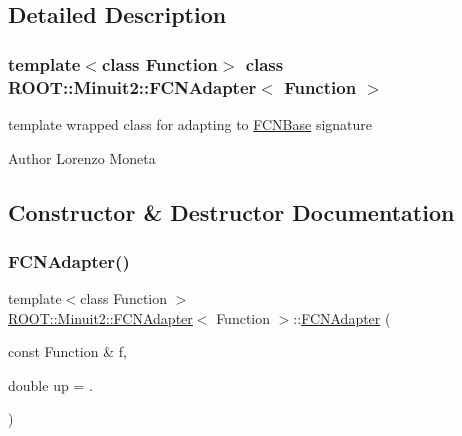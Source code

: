\subsection{Detailed Description}
\subsubsection*{template$<$class Function$>$\newline
class R\+O\+O\+T\+::\+Minuit2\+::\+F\+C\+N\+Adapter$<$ Function $>$}

template wrapped class for adapting to \mbox{\hyperlink{classROOT_1_1Minuit2_1_1FCNBase}{F\+C\+N\+Base}} signature

\begin{DoxyAuthor}{Author}
Lorenzo Moneta 
\end{DoxyAuthor}


\subsection{Constructor \& Destructor Documentation}
\mbox{\label{classROOT_1_1Minuit2_1_1FCNAdapter_a0cd70aee01a37c53792062b4118588dc}} 
\subsubsection{\texorpdfstring{FCNAdapter()}{FCNAdapter()}\hspace{0.1cm}{\footnotesize\ttfamily [1/2]}}
{\footnotesize\ttfamily template$<$class Function $>$ \\
\mbox{\hyperlink{classROOT_1_1Minuit2_1_1FCNAdapter}{R\+O\+O\+T\+::\+Minuit2\+::\+F\+C\+N\+Adapter}}$<$ Function $>$\+::\mbox{\hyperlink{classROOT_1_1Minuit2_1_1FCNAdapter}{F\+C\+N\+Adapter}} (\begin{DoxyParamCaption}\item[{const Function \&}]{f,  }\item[{double}]{up = {.} }\end{DoxyParamCaption})\hspace{0.3cm}{\ttfamily [inline]}}

\mbox{\label{classROOT_1_1Minuit2_1_1FCNAdapter_a6d8b1c24b52ec333fca9cc854533a777}} 

